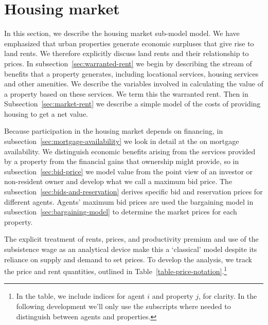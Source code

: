 \section{Housing market} \label{section-rent}
In this section, we describe the housing market sub-model model. %
We have emphasized that urban properties generate economic surpluses that give rise to land rents. We therefore explicitly discuss land rents and their relationship to prices. In subsection~\ref{sec:warranted-rent} we begin by describing the stream of benefits that a property generates, including locational services, housing services and other amenities.  We describe the variables involved in calculating the value of a property based on these services. We term this the \gls{warranted rent}. Then in Subsection~\ref{sec:market-rent} we describe a simple model of the costs of providing housing to get a net value. 

Because participation in the housing market depends on financing, in subsection~\ref{sec:mortgage-availability} we look in detail at the on mortgage availability. We distinguish economic benefits arising from the services provided by a property from the financial gains that ownership might provide, so in subsection~\ref{sec:bid-price} we model value  from the point view of an investor or non-resident owner and develop what we call a maximum bid price.  The subsection~\ref{sec:bids-and-reservation} derives specific bid and reservation prices for different agents. Agents' maximum bid prices are used the bargaining model in subsection~\ref{sec:bargaining-model}  to determine the market prices for each property. 


 The explicit treatment of rents, prices, and  productivity \gls{premium} and use of the \gls{subsistence wage} as an analytical device  make this a `\gls{classical}' model despite its reliance on supply and demand to set prices.  To develop the analysis, we track the price and rent quantities, outlined in Table~\ref{table-price-notation}.\footnote{In the table, we include indices for agent $i$ and property $j$, for clarity. In the following development we'll only use the subscripts where needed to distinguish between agents and properties.}



